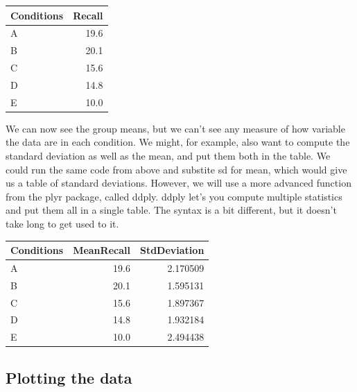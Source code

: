 \begin{tabular}{l|r}
\hline
Conditions & Recall\\
\hline
A & 19.6\\
\hline
B & 20.1\\
\hline
C & 15.6\\
\hline
D & 14.8\\
\hline
E & 10.0\\
\hline
\end{tabular}

We can now see the group means, but we can't see any measure of how
variable the data are in each condition. We might, for example, also
want to compute the standard deviation as well as the mean, and put them
both in the table. We could run the same code from above and substite sd
for mean, which would give us a table of standard deviations. However,
we will use a more advanced function from the plyr package, called
ddply. ddply let's you compute multiple statistics and put them all in a
single table. The syntax is a bit different, but it doesn't take long to
get used to it.

\begin{Shaded}
\begin{Highlighting}[]
\NormalTok{)}
\end{Highlighting}
\end{Shaded}

\begin{tabular}{l|r|r}
\hline
Conditions & MeanRecall & StdDeviation\\
\hline
A & 19.6 & 2.170509\\
\hline
B & 20.1 & 1.595131\\
\hline
C & 15.6 & 1.897367\\
\hline
D & 14.8 & 1.932184\\
\hline
E & 10.0 & 2.494438\\
\hline
\end{tabular}

\subsection{Plotting the data}\label{plotting-the-data}

